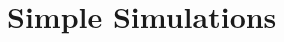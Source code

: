 \documentclass[fleqn,usenatbib]{mnras}
\begin{document}






\appendix

\section{Simple Simulations}
\label{app:coadd_F}



		
		
\end{document}
